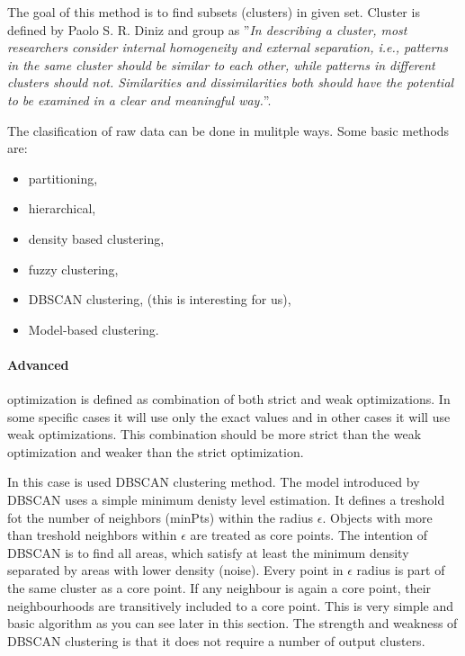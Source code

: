 	The goal of this method is to find subsets (clusters) in given set.
	Cluster is defined by Paolo S. R. Diniz and group as ''\emph{In describing a cluster,
	most researchers consider internal homogeneity and external separation,
	i.e., patterns in the same cluster should be similar to each other, while patterns in different
	clusters should not. Similarities and dissimilarities both should have the potential to be examined in a
	clear and meaningful way.}''. \cite{Lam20141115}

	The clasification of raw data can be done in mulitple ways.
	Some basic methods are:
	\begin{itemize}
		\item partitioning,
		\item hierarchical,
		\item density based clustering,
		\item fuzzy clustering,
		\item DBSCAN clustering, (this is interesting for us),
		\item Model-based clustering.
	\end{itemize}

	\paragraph{Advanced}
	optimization is defined as combination of both strict and weak optimizations.
	In some specific cases it will use only the exact values and in other cases it will use weak optimizations.
	This combination should be more strict than the weak optimization and weaker than the strict optimization.

	In this case is used DBSCAN clustering method\cite{Schubert:2017:DRR:3129336.3068335}.
	The model introduced by DBSCAN uses a simple minimum denisty level estimation.
	It defines a treshold fot the number of neighbors (minPts) within the radius $\epsilon$.
	Objects with more than treshold neighbors within $\epsilon$ are treated as core points.
	The intention of DBSCAN is to find all areas, which satisfy at least the minimum density separated by areas with lower density (noise).
	Every point in $\epsilon$ radius is part of the same cluster as a core point.
	If any neighbour is again a core point, their neighbourhoods are transitively included to a core point.
	This is very simple and basic algorithm as you can see later in this section.
	The strength and weakness of DBSCAN clustering is that it does not require a number of output clusters.

